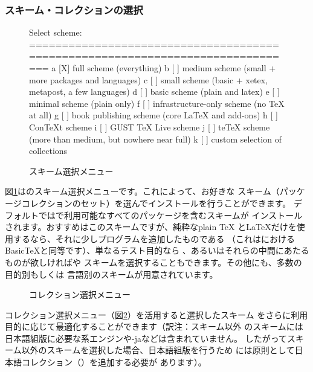 \documentclass[uplatex,dvipdfmx,12pt,tombow]{jsarticle}
\begin{document}
\subsubsection{スキーム・コレクションの選択}
\label{sec:components}

\begin{figure}[tbh]
\begin{boxedverbatim}
Select scheme:
===============================================================================
 a [X] full scheme (everything)
 b [ ] medium scheme (small + more packages and languages)
 c [ ] small scheme (basic + xetex, metapost, a few languages)
 d [ ] basic scheme (plain and latex)
 e [ ] minimal scheme (plain only)
 f [ ] infrastructure-only scheme (no TeX at all)
 g [ ] book publishing scheme (core LaTeX and add-ons)
 h [ ] ConTeXt scheme
 i [ ] GUST TeX Live scheme
 j [ ] teTeX scheme (more than medium, but nowhere near full)
 k [ ] custom selection of collections
\end{boxedverbatim}
\vspace{-1zh}
\caption{スキーム選択メニュー}\label{fig:scheme-text}
\end{figure}

図\ref{fig:scheme-text}は\TL のスキーム選択メニューです。これによって、お好きな
スキーム（パッケージコレクションのセット）を選んでインストールを行うことができます。
デフォルトでは\TL で利用可能なすべてのパッケージを含むスキームが
インストールされます。おすすめはこのスキームですが、純粋なplain \TeX
と\LaTeX だけを使用するなら、それに少しプログラムを追加したものである
（これは\MacTeX におけるBasic\TeX と同等です）、単なるテスト目的なら
、あるいはそれらの中間にあたるものが欲しければや
スキームを選択することもできます。その他にも、多数の目的別もしくは
言語別のスキームが用意されています。

\begin{figure}[tb]
\centering {}
\caption{コレクション選択メニュー}\label{fig:collections-gui}
\end{figure}

コレクション選択メニュー（図\ref{fig:collections-gui}）を活用すると選択したスキーム
をさらに利用目的に応じて最適化することができます（訳注：スキーム以外
のスキームには日本語組版に必要な\pTeX 系エンジンや\LuaTeX-jaなどは含まれていません。
したがってスキーム以外のスキームを選択した場合、日本語組版を行うため
には原則として日本語コレクション（）を追加する必要が
あります）。
\end{document}
